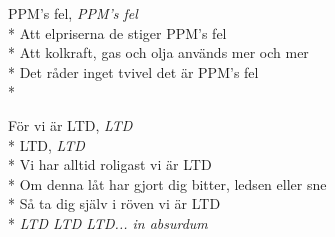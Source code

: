 \begin{SongText}
\begin{SongVerse}
        PPM's fel, \textit{PPM's fel}\\*%
        Att elpriserna de stiger PPM's fel\\*%
        Att kolkraft, gas och olja används mer och mer\\*%
        Det råder inget tvivel det är PPM's fel\\*%
    \end{SongVerse}
    \begin{SongVerse}
        För vi är LTD, \textit{LTD}\\*%
        LTD, \textit{LTD}\\*%
        Vi har alltid roligast vi är LTD\\*%
        Om denna låt har gjort dig bitter, ledsen eller sne\\*%
        Så ta dig själv i röven vi är LTD\\*%
        \textit{LTD LTD LTD... in absurdum}
    \end{SongVerse}
\end{SongText}
